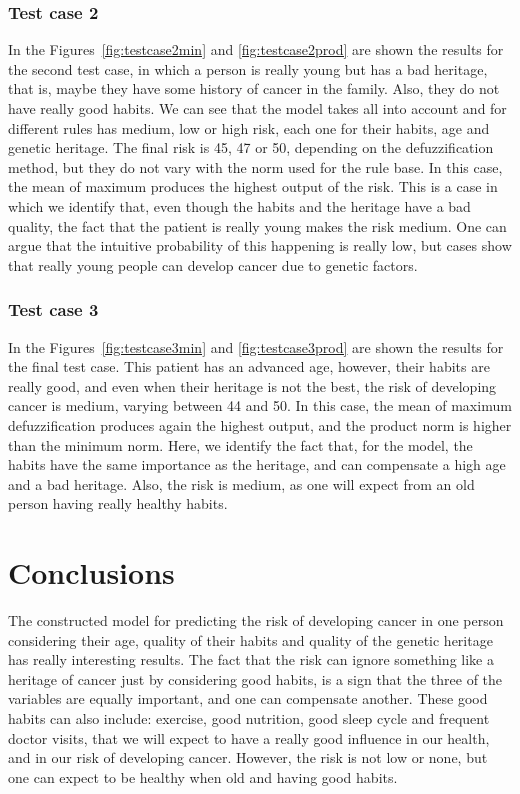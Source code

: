 \documentclass[conference]{IEEEtran}
\begin{document}
\subsubsection{Test case 2}
In the Figures~\ref{fig:testcase2min} and \ref{fig:testcase2prod} are shown the results for the second test case, in which a person is really young but has a bad heritage, that is, maybe they have some history of cancer in the family. Also, they do not have really good habits. We can see that the model takes all into account and for different rules has medium, low or high risk, each one for their habits, age and genetic heritage. The final risk is 45, 47 or 50, depending on the defuzzification method, but they do not vary with the norm used for the rule base. In this case, the mean of maximum produces the highest output of the risk. This is a case in which we identify that, even though the habits and the heritage have a bad quality, the fact that the patient is really young makes the risk medium. One can argue that the intuitive probability of this happening is really low, but cases show that really young people can develop cancer due to genetic factors.


\subsubsection{Test case 3}
In the Figures~\ref{fig:testcase3min} and \ref{fig:testcase3prod} are shown the results for the final test case. This patient has an advanced age, however, their habits are really good, and even when their heritage is not the best, the risk of developing cancer is medium, varying between 44 and 50. In this case, the mean of maximum defuzzification produces again the highest output, and the product norm is higher than the minimum norm. Here, we identify the fact that, for the model, the habits have the same importance as the heritage, and can compensate a high age and a bad heritage. Also, the risk is medium, as one will expect from an old person having really healthy habits.


\section{Conclusions}
The constructed model for predicting the risk of developing cancer in one person considering their age, quality of their habits and quality of the genetic heritage has really interesting results. The fact that the risk can ignore something like a heritage of cancer just by considering good habits, is a sign that the three of the variables are equally important, and one can compensate another. These good habits can also include: exercise, good nutrition, good sleep cycle and frequent doctor visits, that we will expect to have a really good influence in our health, and in our risk of developing cancer. However, the risk is not low or none, but one can expect to be healthy when old and having good habits. \\
\end{document}
